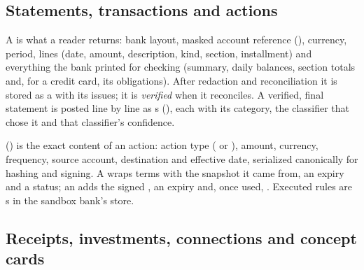 \subsection{Statements, transactions and actions}

A  is what a reader returns: bank layout, masked account reference (), currency,
period, lines (date, amount, description, kind, section, installment) and everything the bank printed for checking
(summary, daily balances, section totals and, for a credit card, its obligations). After redaction and reconciliation
it is stored as a  with its issues; it is \emph{verified} when it reconciles. A verified, final
statement is posted line by line as s (), each with its
category, the classifier that chose it and that classifier's confidence.

 () is the exact content of an action: action type
( or ), amount, currency, frequency, source account, destination
and effective date, serialized canonically for hashing and signing. A  wraps terms with the snapshot it
came from, an expiry and a status; an  adds the signed , an expiry and, once used,
. Executed rules are s in the sandbox bank's store.

\subsection{Receipts, investments, connections and concept cards}\label{sec:new-data}

